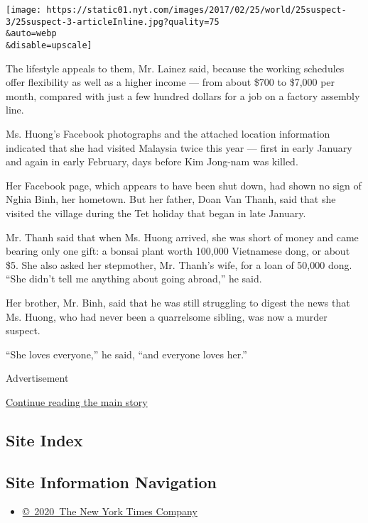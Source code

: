 \texttt{[image: https://static01.nyt.com/images/2017/02/25/world/25suspect-3/25suspect-3-articleInline.jpg?quality=75\\\&auto=webp\\\&disable=upscale]}

The lifestyle appeals to them, Mr. Lainez said, because the working
schedules offer flexibility as well as a higher income --- from about
\$700 to \$7,000 per month, compared with just a few hundred dollars for
a job on a factory assembly line.

Ms. Huong's Facebook photographs and the attached location information
indicated that she had visited Malaysia twice this year --- first in
early January and again in early February, days before Kim Jong-nam was
killed.

Her Facebook page, which appears to have been shut down, had shown no
sign of Nghia Binh, her hometown. But her father, Doan Van Thanh, said
that she visited the village during the Tet holiday that began in late
January.

Mr. Thanh said that when Ms. Huong arrived, she was short of money and
came bearing only one gift: a bonsai plant worth 100,000 Vietnamese
dong, or about \$5. She also asked her stepmother, Mr. Thanh's wife, for
a loan of 50,000 dong. ``She didn't tell me anything about going
abroad,'' he said.

Her brother, Mr. Binh, said that he was still struggling to digest the
news that Ms. Huong, who had never been a quarrelsome sibling, was now a
murder suspect.

``She loves everyone,'' he said, ``and everyone loves her.''

Advertisement

\protect\hyperlink{after-bottom}{Continue reading the main story}

\hypertarget{site-index}{%
\subsection{Site Index}\label{site-index}}

\hypertarget{site-information-navigation}{%
\subsection{Site Information
Navigation}\label{site-information-navigation}}

\begin{itemize}
\tightlist
\item
  \href{https://help.nytimes.com/hc/en-us/articles/115014792127-Copyright-notice}{©~2020~The
  New York Times Company}
\end{itemize}


